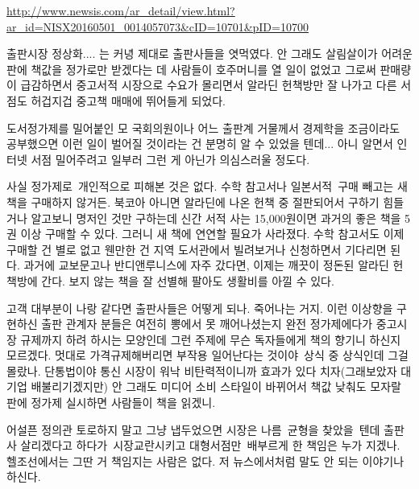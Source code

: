 \vspace{5mm}

\url{http://www.newsis.com/ar_detail/view.html?ar_id=NISX20160501_0014057073&cID=10701&pID=10700}

\vspace{5mm}

출판시장 정상화.... 는 커녕 제대로 출판사들을 엿먹였다.
안 그래도 살림살이가 어려운 판에 책값을 정가로만 받겠다는 데 사람들이 호주머니를 열 일이 없었고
그로써 판매량이 급감하면서 중고서적 시장으로 수요가 몰리면서 알라딘 헌책방만 잘 나가고 다른 서점도 허겁지겁 중고책 매매에 뛰어들게 되었다.
\vspace{5mm}

도서정가제를 밀어붙인 모 국회의원이나 어느 출판계 거물께서 경제학을 조금이라도 공부했으면
이런 일이 벌어질 것이라는 건 분명히 알 수 있었을 텐데... 아니 알면서 인터넷 서점 밀어주려고 일부러 그런 게 아닌가 의심스러울 정도다.
\vspace{5mm}

사실 정가제로 개인적으로 피해본 것은 없다.
수학 참고서나 일본서적 구매 빼고는 새책을 구매하지 않거든.
북코아 아니면 알라딘에 나온 헌책 중 절판되어서 구하기 힘들거나 알고보니 명저인 것만 구하는데
신간 서적 사는 15,000원이면 과거의 좋은 책을 5권 이상 구매할 수 있다. 그러니 새 책에 연연할 필요가 사라졌다.
수학 참고서도 이제 구매할 건 별로 없고 웬만한 건 지역 도서관에서 빌려보거나 신청하면서 기다리면 된다.
과거에 교보문고나 반디앤루니스에 자주 갔다면, 이제는 깨끗이 정돈된 알라딘 헌책방에 간다.
보지 않는 책을 잘 선별해 팔아도 생활비를 아낄 수 있다.
\vspace{5mm}

고객 대부분이 나랑 같다면 출판사들은 어떻게 되나. 죽어나는 거지.
이런 이상향을 구현하신 출판 관계자 분들은 여전히 뽕에서 못 깨어나셨는지 완전 정가제에다가 중고시장 규제까지 하려 하시는 모양인데
그런 주제에 무슨 독자들에게 책의 향기니 하신지 모르겠다.
멋대로 가격규제해버리면 부작용 일어난다는 것이야 상식 중 상식인데 그걸 몰랐나.
단통법이야 통신 시장이 워낙 비탄력적이니까 효과가 있다 치자(그래보았자 대기업 배불리기겠지만)
안 그래도 미디어 소비 스타일이 바뀌어서 책값 낮춰도 모자랄 판에 정가제 실시하면 사람들이 책을 읽겠니.
\vspace{5mm}

어설픈 정의관 토로하지 말고 그냥 냅두었으면 시장은 나름 균형을 찾았을 텐데
출판사 살리겠다고 하다가 시장교란시키고 대형서점만 배부르게 한 책임은 누가 지겠나.
헬조선에서는 그딴 거 책임지는 사람은 없다. 저 뉴스에서처럼 말도 안 되는 이야기나 하신다.
\vspace{5mm}

